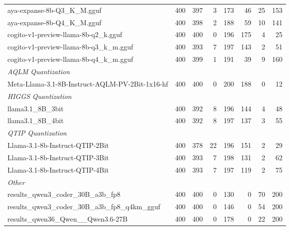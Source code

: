 \begin{table}[htbp]
{\begin{tabular}{lrrrrrrr}
    aya-expanse-8b-Q3\_K\_M.gguf & 400 & 397 & 3 & 173 & 46 & 25 & 153 \\
    aya-expanse-8b-Q4\_K\_M.gguf & 400 & 398 & 2 & 188 & 59 & 10 & 141 \\
    cogito-v1-preview-llama-8b-q2\_k.gguf & 400 & 400 & 0 & 196 & 175 & 4 & 25 \\
    cogito-v1-preview-llama-8b-q3\_k\_m.gguf & 400 & 393 & 7 & 197 & 143 & 2 & 51 \\
    cogito-v1-preview-llama-8b-q4\_k\_m.gguf & 400 & 399 & 1 & 191 & 39 & 9 & 160 \\
    \midrule
    \multicolumn{8}{l}{\textit{AQLM Quantization}} \\
    \midrule
    Meta-Llama-3.1-8B-Instruct-AQLM-PV-2Bit-1x16-hf & 400 & 400 & 0 & 200 & 188 & 0 & 12 \\
    \midrule
    \multicolumn{8}{l}{\textit{HIGGS Quantization}} \\
    \midrule
    llama3.1\_8B\_3bit & 400 & 392 & 8 & 196 & 144 & 4 & 48 \\
    llama3.1\_8B\_4bit & 400 & 392 & 8 & 197 & 137 & 3 & 55 \\
    \midrule
    \multicolumn{8}{l}{\textit{QTIP Quantization}} \\
    \midrule
    Llama-3.1-8b-Instruct-QTIP-2Bit & 400 & 378 & 22 & 196 & 151 & 2 & 29 \\
    Llama-3.1-8b-Instruct-QTIP-3Bit & 400 & 393 & 7 & 198 & 131 & 2 & 62 \\
    Llama-3.1-8b-Instruct-QTIP-4Bit & 400 & 393 & 7 & 197 & 119 & 2 & 75 \\
    \midrule
    \multicolumn{8}{l}{\textit{Other}} \\
    \midrule
    results\_qwen3\_coder\_30B\_a3b\_fp8 & 400 & 400 & 0 & 130 & 0 & 70 & 200 \\
    results\_qwen3\_coder\_30B\_a3b\_fp8\_q4km\_gguf & 400 & 400 & 0 & 146 & 0 & 54 & 200 \\
    results\_qwen36\_Qwen\_\_Qwen3.6-27B & 400 & 400 & 0 & 178 & 0 & 22 & 200 \\
    \bottomrule
  \end{tabular}
  }
\end{table}

